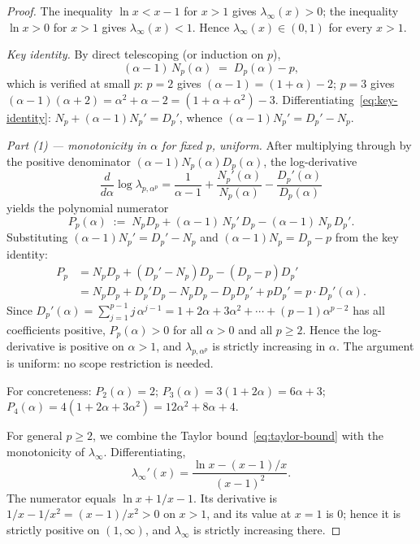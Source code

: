 \documentclass[11pt,a4paper]{article}
\theoremstyle{definition}
\begin{document}
\begin{proof}
The inequality $\ln x < x - 1$ for $x > 1$ gives $\lambda_\infty(x) > 0$; the inequality $\ln x > 0$ for $x > 1$ gives $\lambda_\infty(x) < 1$. Hence $\lambda_\infty(x) \in (0, 1)$ for every $x > 1$.

\medskip

\medskip

\noindent\emph{Key identity.} By direct telescoping (or induction on $p$),
\begin{equation}\label{eq:key-identity}
  (\alpha - 1)\, N_p(\alpha) \;=\; D_p(\alpha) - p,
\end{equation}
which is verified at small $p$: $p=2$ gives $(\alpha-1) = (1+\alpha) - 2$; $p=3$ gives $(\alpha-1)(\alpha+2) = \alpha^2 + \alpha - 2 = (1+\alpha+\alpha^2) - 3$. Differentiating~\eqref{eq:key-identity}: $N_p + (\alpha-1) N_p' = D_p'$, whence $(\alpha-1) N_p' = D_p' - N_p$.

\medskip

\noindent\emph{Part (1) --- monotonicity in $\alpha$ for fixed $p$, uniform.} After multiplying through by the positive denominator $(\alpha-1) N_p(\alpha) D_p(\alpha)$, the log-derivative
\[
  \frac{d}{d\alpha}\log\lambda_{p,\alpha^p}
  = \frac{1}{\alpha - 1} + \frac{N_p'(\alpha)}{N_p(\alpha)} - \frac{D_p'(\alpha)}{D_p(\alpha)}
\]
yields the polynomial numerator
\[
  P_p(\alpha) \;:=\; N_p D_p + (\alpha - 1)\, N_p'\, D_p - (\alpha - 1)\, N_p\, D_p'.
\]
Substituting $(\alpha-1) N_p' = D_p' - N_p$ and $(\alpha-1) N_p = D_p - p$ from the key identity:
\begin{align*}
  P_p &= N_p D_p + (D_p' - N_p) D_p - (D_p - p) D_p' \\
      &= N_p D_p + D_p' D_p - N_p D_p - D_p D_p' + p D_p'
      = p \cdot D_p'(\alpha).
\end{align*}
Since $D_p'(\alpha) = \sum_{j=1}^{p-1} j\,\alpha^{j-1} = 1 + 2\alpha + 3\alpha^2 + \cdots + (p-1)\alpha^{p-2}$ has all coefficients positive, $P_p(\alpha) > 0$ for all $\alpha > 0$ and all $p \geq 2$. Hence the log-derivative is positive on $\alpha > 1$, and $\lambda_{p,\alpha^p}$ is strictly increasing in $\alpha$. The argument is uniform: no scope restriction is needed.

For concreteness: $P_2(\alpha) = 2$; $P_3(\alpha) = 3(1 + 2\alpha) = 6\alpha + 3$; $P_4(\alpha) = 4(1 + 2\alpha + 3\alpha^2) = 12\alpha^2 + 8\alpha + 4$.

For general $p \geq 2$, we combine the Taylor bound~\eqref{eq:taylor-bound} with the monotonicity of $\lambda_\infty$. Differentiating,
\[
  \lambda_\infty'(x)
  = \frac{\ln x - (x-1)/x}{(x-1)^2}.
\]
The numerator equals $\ln x + 1/x - 1$. Its derivative is $1/x - 1/x^2 = (x-1)/x^2 > 0$ on $x > 1$, and its value at $x = 1$ is $0$; hence it is strictly positive on $(1, \infty)$, and $\lambda_\infty$ is strictly increasing there.


\end{proof}
\end{document}
